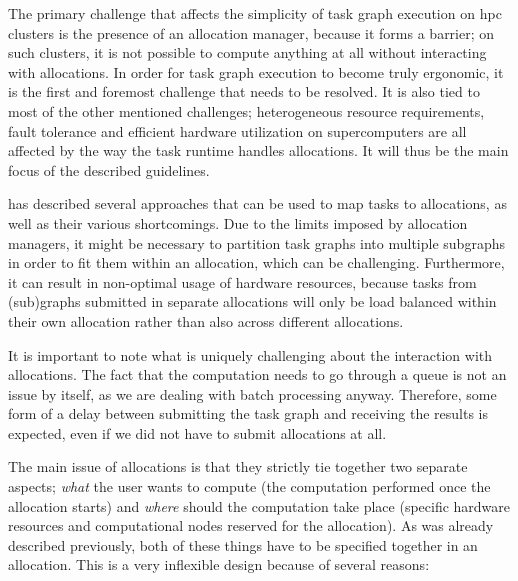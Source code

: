 The primary challenge that affects the simplicity of task graph execution on
\gls{hpc} clusters is the presence of an allocation manager, because it forms a
barrier; on such clusters, it is not possible to compute anything at all without interacting with
allocations. In order for task graph execution to become truly ergonomic, it is the first and
foremost challenge that needs to be resolved. It is also tied to most of the other mentioned
challenges; heterogeneous resource requirements, fault tolerance and efficient hardware utilization
on supercomputers are all affected by the way the task runtime handles allocations. It will thus be
the main focus of the described guidelines.

 has described several approaches that can be used to map tasks to
allocations, as well as their various shortcomings. Due to the limits imposed by allocation
managers, it might be necessary to partition task graphs into multiple subgraphs in order to fit
them within an allocation, which can be challenging. Furthermore, it can result in non-optimal
usage of hardware resources, because tasks from (sub)graphs submitted in separate allocations will
only be load balanced within their own allocation rather than also across different allocations.

It is important to note what is uniquely challenging about the interaction with allocations. The
fact that the computation needs to go through a queue is not an issue by itself, as we are dealing
with batch processing anyway. Therefore, some form of a delay between submitting the task graph and
receiving the results is expected, even if we did not have to submit allocations at all.

The main issue of allocations is that they strictly tie together two separate aspects;
\emph{what} the user wants to compute (the computation performed once the allocation
starts) and \emph{where} should the computation take place (specific hardware resources
and computational nodes reserved for the allocation). As was already described previously, both of
these things have to be specified together in an allocation. This is a very inflexible design because of
several reasons:

